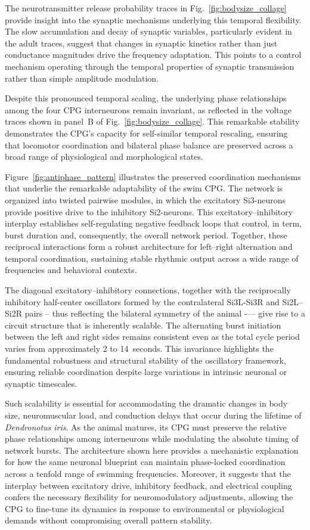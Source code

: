 \documentclass[nofootinbib,aip,amsmath,amssymb,reprint,twocolumn,10pt]{revtex4-2}
\begin{document}
The neurotransmitter release probability traces in Fig.~\ref{fig:bodysize_collage} provide insight into the synaptic mechanisms underlying this temporal flexibility. The slow accumulation and decay of synaptic variables, particularly evident in the adult traces, suggest that changes in synaptic kinetics rather than just conductance magnitudes drive the frequency adaptation. This points to a control mechanism operating through the temporal properties of synaptic transmission rather than simple amplitude modulation.

 Despite this pronounced temporal scaling, the underlying phase relationships among the four CPG interneurons remain invariant, as reflected in the voltage traces shown in panel~B of Fig.~\ref{fig:bodysize_collage}. This remarkable stability demonstrates the CPG's capacity for self-similar temporal rescaling, ensuring that locomotor coordination and bilateral phase balance are preserved across a broad range of physiological and morphological states. 
 
Figure~\ref{fig:antiphase_pattern} illustrates the preserved coordination mechanisms that underlie the remarkable adaptability of the swim CPG. The network is organized into twisted pairwise modules, in which the excitatory Si3-neurons provide positive drive to the inhibitory Si2-neurons. This excitatory–inhibitory interplay establishes self-regulating negative feedback loops that control, in term, burst duration and, consequently, the overall network period. Together, these reciprocal interactions form a robust architecture for left–right alternation and temporal coordination, sustaining stable rhythmic output across a wide range of frequencies and behavioral contexts.

The diagonal excitatory–inhibitory connections, together with the reciprocally inhibitory half-center oscillators formed by the contralateral Si3L-Si3R and Si2L--Si2R pairs -- thus reflecting the bilateral symmetry of the animal -— give rise to a circuit structure that is inherently scalable. The alternating burst initiation between the left and right sides remains consistent even as the total cycle period varies from approximately 2 to 14~seconds. This invariance highlights the fundamental robustness and structural stability of the oscillatory framework, ensuring reliable coordination despite large variations in intrinsic neuronal or synaptic timescales.

Such scalability is essential for accommodating the dramatic changes in body size, neuromuscular load, and conduction delays that occur during the lifetime of {\em Dendronotus iris}. As the animal matures, its CPG must preserve the relative phase relationships among interneurons while modulating the absolute timing of network bursts. The architecture shown here provides a mechanistic explanation for how the same neuronal blueprint can maintain phase-locked coordination across a tenfold range of swimming frequencies. Moreover, it suggests that the interplay between excitatory drive, inhibitory feedback, and electrical coupling confers the necessary flexibility for neuromodulatory adjustments, allowing the CPG to fine-tune its dynamics in response to environmental or physiological demands without compromising overall pattern stability.
\end{document}
